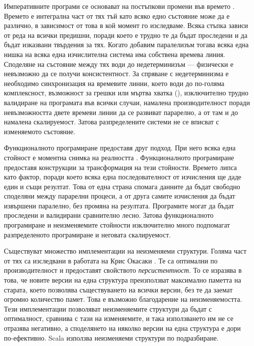 Императивните програми се основават на постъпкови промени във времето \cite{odersky2013ObjectsAndFunctions}. Времето е интегрална част от тях тъй като всяко едно състояние може да е различно, в зависимост от това в кой момент го изследваме. Всяка стъпка зависи от реда на всички предишни, поради което е трудно те да бъдат проследени и да бъдат изказвани твърдения за тях. Когато добавим паралелизъм тогава всяка една нишка на всяка една изчислителна система има собствена времева линия. Споделяне на състояние между тях води до недетерминизъм — физически е невъзможно да се получи консистентност. За спряване с недетерминизма е необходимо синхронизация на времевите линии, което води до по-голяма комплексност, възможност за грешки или мъртва хватка (), изключително трудно валидиране на програмата във всички случаи, намалена производителност поради невъзможността двете времеви линии да се развиват парарелно, а от там и до намалена скалируемост. Затова разпределените системи не се вписват с изменяемото състояние.

Функционалното програмиране предоставя друг подход. При него всяка една стойност е моментна снимка на реалността \cite{odersky2013ObjectsAndFunctions}\cite[глава 3]{bernhardt2015ReactiveWeb}. Функционалното програмиране предоставя конструкции за трансформация на тези стойности. Времето липса като фактор, поради което всяка една последователност от изчисления ще даде един и същи резултат. Това от една страна спомага данните да бъдат свободно споделяни между парарелни процеси, а от друга самите изчисления да бъдат извършени паралелно, без промяна на резултата. Програмите могат да бъдат проследени и валидирани сравнително лесно. Затова функционалното програмиране и неизменяемите стойности изключително много подпомагат разпределеното програмиране и неговата скалируемост.

Съществуват множество имплементации на неизменяеми структури. Голяма част от тях са изследвани в работата на Крис Окасаки \cite{okasakiFunctionalDS}. Те са оптимални по производителност и предоставят свойството \emph{персистентност}. То се изразява в това, че новите версии на една структура преизползват максимално паметта на старата, което позволява съществуването на всички версии, без те да заемат огромно количество памет. Това е възможно благодарение на неизменяемостта. Тези имплементации позволяват неизменяемите структури да бъдат с оптималност, сравнива с тази на изменяемите, и така използването им не се отразява негативно, а споделянето на няколко версии на една структура е дори по-ефективно. Scala използва неизменяеми структури по подразбиране.

